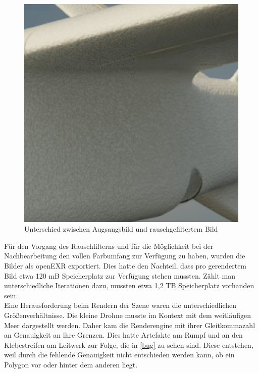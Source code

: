 \begin{figure}[H]
\begin{center}
\includegraphics[width=\textwidth]{gfx/post/denoising.jpg}
\caption{Unterschied zwischen Augsangsbild und rauschgefiltertem Bild}
\label{denoising}
\end{center}
\end{figure}
\noindent
Für den Vorgang des Rauschfilterns und für die Möglichkeit bei der Nachbearbeitung den vollen Farbumfang zur Verfügung zu haben, wurden die Bilder als openEXR exportiert. Dies hatte den Nachteil, dass pro gerendertem Bild etwa 120 mB Speicherplatz zur Verfügung stehen mussten. Zählt man unterschiedliche Iterationen dazu, mussten etwa 1,2 TB Speicherplatz vorhanden sein.\\
Eine Herausforderung beim Rendern der Szene waren die unterschiedlichen Größenverhältnisse. Die kleine Drohne musste im Kontext mit dem weitläufigen Meer dargestellt werden. Daher kam die Renderengine mit ihrer Gleitkommazahl an Genauigkeit an ihre Grenzen. Dies hatte Artefakte am Rumpf und an den Klebestreifen am Leitwerk zur Folge, die in \autoref{bug} zu sehen sind. Diese entstehen, weil durch die fehlende Genauigkeit nicht entschieden werden kann, ob ein Polygon vor oder hinter dem anderen liegt.

